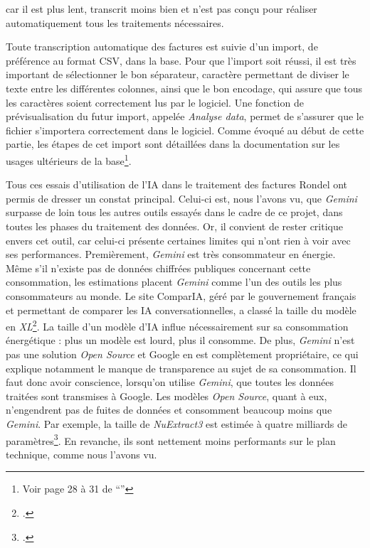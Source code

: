 car il est plus lent, transcrit moins bien et n'est pas conçu pour réaliser automatiquement tous les traitements nécessaires.  

Toute transcription automatique des factures est suivie d'un import, de préférence au format CSV, dans la base. Pour que l'import soit réussi, il est très important de sélectionner le bon séparateur, caractère permettant de diviser le texte entre les différentes colonnes, ainsi que le bon encodage, qui assure que tous les caractères soient correctement lus par le logiciel. Une fonction de prévisualisation du futur import, appelée \emph{Analyse data}, permet de s'assurer que le fichier s'importera correctement dans le logiciel. Comme évoqué au début de cette partie, les étapes de cet import sont détaillées dans la documentation sur les usages ultérieurs de la base\footnote{Voir page 28 à 31 de \enquote{}}. 


Tous ces essais d'utilisation de l'IA dans le traitement des factures Rondel ont permis de dresser un constat principal. Celui-ci est, nous l'avons vu, que \emph{Gemini} surpasse de loin tous les autres outils essayés dans le cadre de ce projet, dans toutes les phases du traitement des données. Or, il convient de rester critique envers cet outil, car celui-ci présente certaines limites qui n'ont rien à voir avec ses performances. Premièrement, \emph{Gemini} est très consommateur en énergie. Même s'il n'existe pas de données chiffrées publiques concernant cette consommation, les estimations placent \emph{Gemini} comme l'un des outils les plus consommateurs au monde. Le site ComparIA, géré par le gouvernement français et permettant de comparer les IA conversationnelles, a classé la taille du modèle en \emph{XL}\footcite{noauthor_classement_nodate}. La taille d'un modèle d'IA influe nécessairement sur sa consommation énergétique : plus un modèle est lourd, plus il consomme. De plus, \emph{Gemini} n'est pas une solution \emph{Open Source} et Google en est complètement propriétaire, ce qui explique notamment le manque de transparence au sujet de sa consommation. Il faut donc avoir conscience, lorsqu'on utilise \emph{Gemini}, que toutes les données traitées sont transmises à Google. Les modèles \emph{Open Source}, quant à eux, n'engendrent pas de fuites de données et consomment beaucoup moins que \emph{Gemini}. Par exemple, la taille de \emph{NuExtract3} est estimée à quatre milliards de paramètres\footcite{numind_nuextract_nodate}.
En revanche, ils sont nettement moins performants sur le plan technique, comme nous l'avons vu. 

